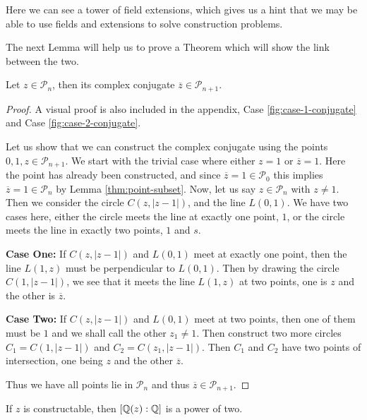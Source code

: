 Here we can see a tower of field extensions, which gives us a hint that we may be able to use fields and extensions to solve construction problems.

The next Lemma will help us to prove a Theorem which will show the link between the two.

\begin{lemma}\label{lemma:conjugate-in-Pn}
    Let $z \in \mathcal{P}_n$, then its complex conjugate $\overline{z} \in \mathcal{P}_{n+1}$.
\end{lemma}

\begin{proof}  
    A visual proof is also included in the appendix, Case \ref{fig:case-1-conjugate} and Case \ref{fig:case-2-conjugate}.
    
    Let us show that we can construct the complex conjugate using the points $0, 1, z\in \mathcal{P}_{n+1}$.
    We start with the trivial case where either $z=1$ or $\overline{z}=1$. Here the point has already been constructed, and since $\overline{z}=1\in \mathcal{P}_0$ this implies $\overline{z}=1\in \mathcal{P}_n$ by Lemma \ref{thm:point-subset}.
\newline
\noindent
    Now, let us say $z\in \mathcal{P}_n$ with $z\neq1$. Then we consider the circle $C(z,|z-1|)$, and the line $L(0,1)$. We have two cases here, either the circle meets the line at exactly one point, $1$, or the circle meets the line in exactly two points, $1$ and $s$.

    \textbf{Case One:} If $C(z,|z-1|)$ and $L(0,1)$ meet at exactly one point, then the line $L(1,z)$ must be perpendicular to $L(0,1)$. Then by drawing the circle $C(1,|z-1|)$, we see that it meets the line $L(1,z)$ at two points, one is $z$ and the other is $\overline{z}$.

    \textbf{Case Two:} If $C(z,|z-1|)$ and $L(0,1)$ meet at two points, then one of them must be $1$ and we shall call the other $z_1\neq1$. Then construct two more circles $C_1=C(1,|z-1|)$ and $C_2=C(z_1,|z-1|)$. Then $C_1$ and $C_2$ have two points of intersection, one being $z$ and the other $\overline{z}$.

    Thus we have all points lie in $\mathcal{P}_n$ and thus $\overline{z} \in \mathcal{P}_{n+1}$.
\end{proof}

\begin{theorem}\label{thm:power-of-two-construction}
    If $z$ is constructable, then $[\mathbb Q(z):\mathbb Q]$ is a power of two.
\end{theorem}

